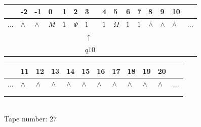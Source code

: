 \documentclass[11pt]{article}
\begin{document}
\begin{table}[H]
\centering
\begin{tabular}{lllllllllllllll}
 & -2 & -1 & 0 & 1 & 2 & 3 & 4 & 5 & 6 & 7 & 8 & 9 & 10 & \\
\hline
$...$ & \multicolumn{1}{|l|}{$\wedge$} & \multicolumn{1}{|l|}{$\wedge$} & \multicolumn{1}{|l|}{$M$} & \multicolumn{1}{|l|}{$1$} & \multicolumn{1}{|l|}{$\Psi$} & \multicolumn{1}{|l|}{$1$} & \multicolumn{1}{|l|}{$1$} & \multicolumn{1}{|l|}{$\Omega$} & \multicolumn{1}{|l|}{$1$} & \multicolumn{1}{|l|}{$1$} & \multicolumn{1}{|l|}{$\wedge$} & \multicolumn{1}{|l|}{$\wedge$} & \multicolumn{1}{|l|}{$\wedge$} & $...$\\
\hline
&  &  &  &  &  & $\uparrow$ &  &  &  &  &  &  &  &  \\
&  &  &  &  &  & $ q10 $ &  &  &  &  &  &  &  &  \\
\end{tabular}
\begin{tabular}{llllllllllll}
 & 11 & 12 & 13 & 14 & 15 & 16 & 17 & 18 & 19 & 20 & \\
\hline
$...$ & \multicolumn{1}{|l|}{$\wedge$} & \multicolumn{1}{|l|}{$\wedge$} & \multicolumn{1}{|l|}{$\wedge$} & \multicolumn{1}{|l|}{$\wedge$} & \multicolumn{1}{|l|}{$\wedge$} & \multicolumn{1}{|l|}{$\wedge$} & \multicolumn{1}{|l|}{$\wedge$} & \multicolumn{1}{|l|}{$\wedge$} & \multicolumn{1}{|l|}{$\wedge$} & \multicolumn{1}{|l|}{$\wedge$} & $...$\\
\hline
&  &  &  &  &  &  &  &  &  &  &  \\
&  &  &  &  &  &  &  &  &  &  &  \\
\end{tabular}
\\
Tape number: 27
\noindent\makebox[\linewidth]{\hdashrule{\textwidth}{1pt}{1pt}}\end{table}
\clearpage
\end{document}
